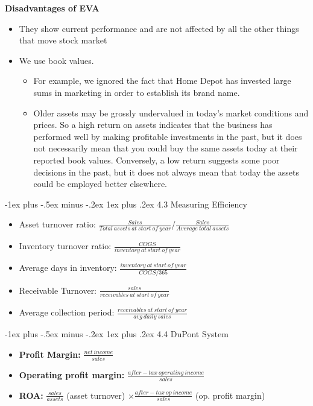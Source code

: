 \documentclass[10pt,landscape]{article}
\makeatletter
\newcommand{\subsubsubsection}{\@startsection{subsubsection}{3}{0mm}%
                                {-1ex plus -.5ex minus -.2ex}%
                                {1ex plus .2ex}%
                                {\normalfont\scriptsize\bfseries}}
\makeatother
\begin{document}
\begin{multicols*}{3}
\textbf{Disadvantages of EVA}
\begin{itemize}[topsep=0pt,noitemsep,wide=0pt, leftmargin=\dimexpr{} + 2\relax]
    \item They show current performance and are not affected by all the other things that move stock market
    \item We use book values.
    \begin{itemize}[topsep=0pt,noitemsep,wide=0pt, leftmargin=\dimexpr{} + 2\relax]
        \item For example, we ignored the fact that Home Depot has invested large sums in marketing in
        order to establish its brand name.
        \item  Older assets may be grossly undervalued in today’s market conditions and prices. So a high
        return on assets indicates that the business has performed well by making profitable
        investments in the past, but it does not necessarily mean that you could buy the same assets
        today at their reported book values. Conversely, a low return suggests some poor decisions in
        the past, but it does not always mean that today the assets could be employed better
        elsewhere.
    \end{itemize}
\end{itemize}

\subsubsubsection{4.3 Measuring Efficiency}
\begin{itemize}[topsep=0pt,noitemsep,wide=0pt, leftmargin=\dimexpr{} + 2\relax]
    \item Asset turnover ratio: $\frac{Sales}{Total \ assets \ at \ start \ of \ year}$/$\frac{Sales}{Average \ total \ assets}$
    \item Inventory turnover ratio: $\frac{COGS}{inventory \ at \ start \ of \ year}$
    \item Average days in inventory: $\frac{inventory \ at \ start \ of \ year}{COGS/365}$
    \item Receivable Turnover: $\frac{sales}{receivables \ at \ start \ of \ year}$
    \item Average collection period: $\frac{receivables \ at \ start \ of \ year}{avg \ daily \ sales}$
\end{itemize}

\subsubsubsection{4.4 DuPont System}
\begin{itemize}[topsep=0pt,noitemsep,wide=0pt, leftmargin=\dimexpr{} + 2\relax]
    \item \textbf{Profit Margin:} $\frac{net \ income}{sales}$
    \item \textbf{Operating profit margin:} $\frac{after-tax \ operating \ income}{sales}$
    \item \textbf{ROA:} $\frac{sales}{assets}$ (asset turnover) $\times \frac{after-tax \ op \ income}{sales}$ (op. profit margin)
\end{itemize}


\end{multicols*}
\end{document}
